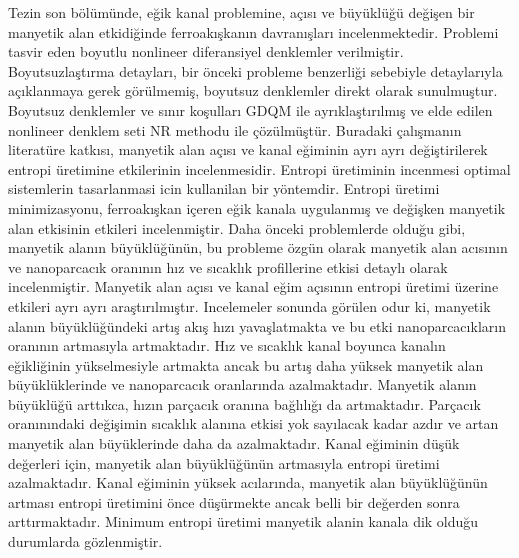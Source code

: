 Tezin son b\"{o}l\"{u}m\"{u}nde, e\u{g}ik kanal problemine, a\c{c}{\i}s{\i} ve b\"{u}y\"{u}kl\"{u}\u{g}\"{u} de\u{g}i\c{s}en bir manyetik alan etkidi\u{g}inde ferroak{\i}\c{s}kan{\i}n davran{\i}\c{s}lar{\i} incelenmektedir. Problemi tasvir eden boyutlu nonlineer diferansiyel denklemler verilmi\c{s}tir. Boyutsuzla\c{s}t{\i}rma detaylar{\i}, bir \"{o}nceki probleme benzerli\u{g}i sebebiyle detaylar{\i}yla a\c{c}{\i}klanmaya gerek g\"{o}r\"{u}lmemi\c{s}, boyutsuz denklemler direkt olarak sunulmu\c{s}tur. Boyutsuz denklemler ve s{\i}n{\i}r ko\c{s}ullar{\i} GDQM ile ayr{\i}kla\c{s}t{\i}r{\i}lm{\i}\c{s} ve elde edilen nonlineer denklem seti NR methodu ile \c{c}\"{o}z\"{u}lm\"{u}\c{s}t\"{u}r. Buradaki \c{c}al{\i}\c{s}man{\i}n literat\"{u}re katk{\i}s{\i}, manyetik alan a\c{c}{\i}s{\i} ve kanal e\u{g}iminin ayr{\i} ayr{\i} de\u{g}i\c{s}tirilerek entropi \"{u}retimine etkilerinin incelenmesidir.  Entropi \"{u}retiminin incenmesi optimal sistemlerin tasarlanmasi icin kullanilan bir y\"{o}ntemdir. Entropi \"{u}retimi minimizasyonu, ferroak{\i}\c{s}kan i\c{c}eren e\u{g}ik kanala uygulanm{\i}\c{s} ve de\u{g}i\c{s}ken manyetik alan etkisinin etkileri incelenmi\c{s}tir. Daha \"{o}nceki problemlerde oldu\u{g}u gibi, manyetik alan{\i}n b\"{u}y\"{u}kl\"{u}\u{g}\"{u}n\"{u}n, bu probleme \"{o}zg\"{u}n olarak manyetik alan ac{\i}s{\i}n{\i}n ve nanoparcac{\i}k oran{\i}n{\i}n h{\i}z ve s{\i}cakl{\i}k profillerine etkisi detayl{\i} olarak incelenmi\c{s}tir. Manyetik alan a\c{c}{\i}s{\i} ve kanal e\u{g}im a\c{c}{\i}s{\i}n{\i}n entropi \"{u}retimi \"{u}zerine etkileri ayr{\i} ayr{\i} ara\c{s}t{\i}r{\i}lm{\i}\c{s}t{\i}r. Incelemeler sonunda g\"{o}r\"{u}len odur ki, manyetik alan{\i}n b\"{u}y\"{u}kl\"{u}\u{g}\"{u}ndeki art{\i}\c{s} ak{\i}\c{s} h{\i}z{\i} yava\c{s}latmakta ve bu etki nanoparcac{\i}klar{\i}n oran{\i}n{\i}n artmas{\i}yla artmaktad{\i}r. H{\i}z ve s{\i}cakl{\i}k kanal boyunca kanal{\i}n e\u{g}ikli\u{g}inin y\"{u}kselmesiyle artmakta ancak bu art{\i}\c{s} daha y\"{u}ksek manyetik alan b\"{u}y\"{u}kl\"{u}klerinde ve nanoparcac{\i}k oranlar{\i}nda azalmaktad{\i}r. Manyetik alan{\i}n b\"{u}y\"{u}kl\"{u}\u{g}\"{u} artt{\i}kca, h{\i}z{\i}n par\c{c}ac{\i}k oran{\i}na ba\u{g}l{\i}l{\i}\u{g}{\i} da artmaktad{\i}r. Par\c{c}ac{\i}k oran{\i}n{\i}ndaki de\u{g}i\c{s}imin s{\i}cakl{\i}k alan{\i}na etkisi yok say{\i}lacak kadar azd{\i}r ve artan manyetik alan b\"{u}y\"{u}klerinde daha da azalmaktad{\i}r. Kanal e\u{g}iminin d\"{u}\c{s}\"{u}k de\u{g}erleri i\c{c}in, manyetik alan b\"{u}y\"{u}kl\"{u}\u{g}\"{u}n\"{u}n artmas{\i}yla entropi \"{u}retimi azalmaktad{\i}r. Kanal e\u{g}iminin y\"{u}ksek ac{\i}lar{\i}nda, manyetik alan b\"{u}y\"{u}kl\"{u}\u{g}\"{u}n\"{u}n artmas{\i} entropi \"{u}retimini \"{o}nce d\"{u}\c{s}\"{u}rmekte ancak belli bir de\u{g}erden sonra artt{\i}rmaktad{\i}r. Minimum entropi \"{u}retimi manyetik alanin kanala dik oldu\u{g}u durumlarda g\"{o}zlenmi\c{s}tir.

